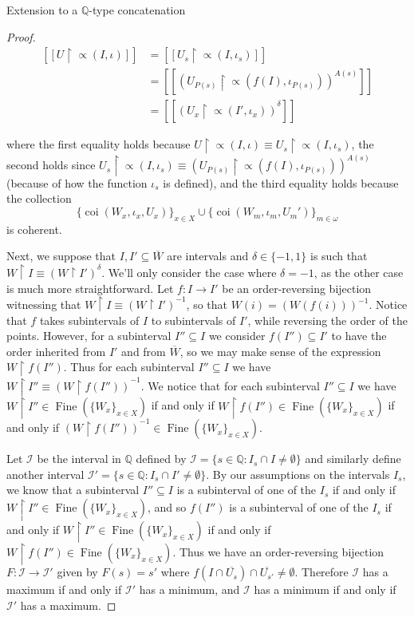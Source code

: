 \documentclass{amsart}
\theoremstyle{definition}\newtheorem{theorem}{Theorem}
\theoremstyle{definition}\newtheorem*{A}{Main Theorem}
\theoremstyle{definition}\newtheorem*{B}{Theorem \ref{elementaryequiv}}
\theoremstyle{definition}\newtheorem*{C}{Theorem \ref{continuous}}
\theoremstyle{definition}\newtheorem*{D}{Theorem \ref{bigisomorphism2}}
\theoremstyle{definition}\newtheorem{bigtheorem}{Main Theorem}
\numberwithin{theorem}{section}
\theoremstyle{definition}\newtheorem{corollary}[theorem]{Corollary}
\theoremstyle{definition}\newtheorem{proposition}[theorem]{Proposition}
\theoremstyle{definition}\newtheorem{definition}[theorem]{Definition}
\theoremstyle{definition}\newtheorem{question}[theorem]{Question}
\theoremstyle{definition}\newtheorem{example}[theorem]{Example}
\theoremstyle{definition}\newtheorem{remark}[theorem]{Remark}
\theoremstyle{definition}\newtheorem{note}[theorem]{Note}
\theoremstyle{definition}\newtheorem{lemma}[theorem]{Lemma}
\theoremstyle{definition}\newtheorem{fact}[theorem]{Fact}
\theoremstyle{definition}\newtheorem{define}[theorem]{Definition}
\theoremstyle{definition}\newtheorem{claim}[theorem]{Claim}
\theoremstyle{definition}\newtheorem{obs}[theorem]{Observation}
\theoremstyle{definition}\newtheorem{definitions}[theorem]{Definitions}
\newcommand{\Fine}{\operatorname{Fine}}
\newcommand{\coi}{\operatorname{coi}}
\begin{document}
\begin{section}{Extension to a $\mathbb{Q}$-type concatenation}
\begin{proof}
$$
\begin{array}{ll}
[[U \upharpoonright \varpropto(I, \iota)]] & = [[U_s \upharpoonright \varpropto(I, \iota_s)]]\\
& = [[(U_{P(s)} \upharpoonright \varpropto(f(I), \iota_{P(s)}))^{A(s)}]]\\
& = [[(U_x \upharpoonright \varpropto(I', \iota_x))^{\delta}]]



\end{array}
$$

\noindent where the first equality holds because $U \upharpoonright \varpropto(I, \iota) \equiv U_s \upharpoonright \varpropto(I, \iota_s)$, the second holds since $U_s \upharpoonright \varpropto(I, \iota_s) \equiv (U_{P(s)} \upharpoonright \varpropto(f(I), \iota_{P(s)}))^{A(s)}$ (because of how the function $\iota_s$ is defined), and the third equality holds because the collection $$\{\coi(W_x, \iota_x, U_x)\}_{x \in X} \cup \{\coi(W_m, \iota_m, U_m')\}_{m \in \omega}$$ is coherent.

Next, we suppose that $I, I' \subseteq \overline{W}$ are intervals and $\delta \in \{-1, 1\}$ is such that $W \upharpoonright I \equiv (W \upharpoonright I')^{\delta}$.  We'll only consider the case where $\delta = -1$, as the other case is much more straightforward.  Let $f: I \rightarrow I'$ be an order-reversing bijection witnessing that $W \upharpoonright I \equiv (W \upharpoonright I')^{-1}$, so that $W(i) = (W(f(i)))^{-1}$.  Notice that $f$ takes subintervals of $I$ to subintervals of $I'$, while reversing the order of the points.  However, for a subinterval $I'' \subseteq I$ we consider $f(I'') \subseteq I'$ to have the order inherited from $I'$ and from $\overline{W}$, so we may make sense of the expression $W \upharpoonright f(I'')$.  Thus for each subinterval $I'' \subseteq I$ we have $W \upharpoonright I'' \equiv (W \upharpoonright f(I''))^{-1}$.  We notice that for each subinterval $I'' \subseteq I$ we have $W \upharpoonright I'' \in \Fine(\{W_x\}_{x \in X})$ if and only if $W \upharpoonright f(I'')\in \Fine(\{W_x\}_{x \in X})$ if and only if $(W \upharpoonright f(I''))^{-1} \in \Fine(\{W_x\}_{x \in X})$.


Let $\mathcal{I}$ be the interval in $\mathbb{Q}$ defined by $\mathcal{I} = \{s \in \mathbb{Q}: I_s \cap I \neq \emptyset\}$ and similarly define another interval $\mathcal{I}' = \{s \in \mathbb{Q}: I_s \cap I' \neq \emptyset\}$.  By our assumptions on the intervals $I_s$, we know that a subinterval $I'' \subseteq I$ is a subinterval of one of the $I_s$ if and only if $W \upharpoonright I'' \in \Fine(\{W_x\}_{x \in X})$, and so $f(I'')$ is a subinterval of one of the $I_s$ if and only if $W \upharpoonright I'' \in \Fine(\{W_x\}_{x \in X})$ if and only if $W \upharpoonright f(I'') \in \Fine(\{W_x\}_{x \in X})$.  Thus we have an order-reversing bijection $F: \mathcal{I} \rightarrow \mathcal{I}'$ given by $F(s) = s'$ where $f(I \cap \overline{U_s}) \cap \overline{U_{s'}} \neq \emptyset$.  Therefore $\mathcal{I}$ has a maximum if and only if $\mathcal{I}'$ has a minimum, and $\mathcal{I}$ has a minimum if and only if $\mathcal{I}'$ has a maximum.


\end{proof}
\end{section}
\end{document}
